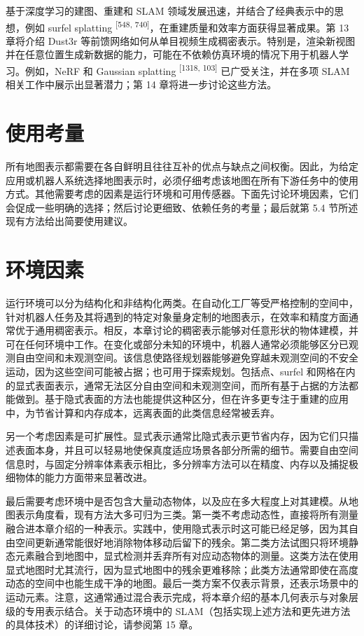 基于深度学习的建图、重建和 SLAM 领域发展迅速，并结合了经典表示中的思想，例如 surfel splatting \textsuperscript{[548, 740]}，在重建质量和效率方面获得显著成果。第 13 章将介绍 Dust3r 等前馈网络如何从单目视频生成稠密表示。特别是，渲染新视图并在任意位置生成新数据的能力，可能在不依赖仿真环境的情况下用于机器人学习。例如，NeRF 和 Gaussian splatting \textsuperscript{[1318, 103]} 已广受关注，并在多项 SLAM 相关工作中展示出显著潜力；第 14 章将进一步讨论这些方法。

\section{使用考量}

所有地图表示都需要在各自鲜明且往往互补的优点与缺点之间权衡。因此，为给定应用或机器人系统选择地图表示时，必须仔细考虑该地图在所有下游任务中的使用方式。其他需要考虑的因素是运行环境和可用传感器。下面先讨论环境因素，它们会促成一些明确的选择；然后讨论更细致、依赖任务的考量；最后就第 5.4 节所述现有方法给出简要使用建议。

\section{环境因素}

运行环境可以分为结构化和非结构化两类。在自动化工厂等受严格控制的空间中，针对机器人任务及其将遇到的特定对象量身定制的地图表示，在效率和精度方面通常优于通用稠密表示。相反，本章讨论的稠密表示能够对任意形状的物体建模，并可在任何环境中工作。在变化或部分未知的环境中，机器人通常必须能够区分已观测自由空间和未观测空间。该信息使路径规划器能够避免穿越未观测空间的不安全运动，因为这些空间可能被占据；也可用于探索规划。包括点、surfel 和网格在内的显式表面表示，通常无法区分自由空间和未观测空间，而所有基于占据的方法都能做到。基于隐式表面的方法也能提供这种区分，但在许多更专注于重建的应用中，为节省计算和内存成本，远离表面的此类信息经常被丢弃。

另一个考虑因素是可扩展性。显式表示通常比隐式表示更节省内存，因为它们只描述表面本身，并且可以轻易地使保真度适应场景各部分所需的细节。需要自由空间信息时，与固定分辨率体素表示相比，多分辨率方法可以在精度、内存以及捕捉极细物体的能力方面带来显著改进。

最后需要考虑环境中是否包含大量动态物体，以及应在多大程度上对其建模。从地图表示角度看，现有方法大多可归为三类。第一类不考虑动态性，直接将所有测量融合进本章介绍的一种表示。实践中，使用隐式表示时这可能已经足够，因为其自由空间更新通常能很好地消除物体移动后留下的残余。第二类方法试图只将环境静态元素融合到地图中，显式检测并丢弃所有对应动态物体的测量。这类方法在使用显式地图时尤其流行，因为显式地图中的残余更难移除；此类方法通常即使在高度动态的空间中也能生成干净的地图。最后一类方案不仅表示背景，还表示场景中的运动元素。注意，这通常通过混合表示完成，将本章介绍的基本几何表示与对象层级的专用表示结合。关于动态环境中的 SLAM（包括实现上述方法和更先进方法的具体技术）的详细讨论，请参阅第 15 章。

